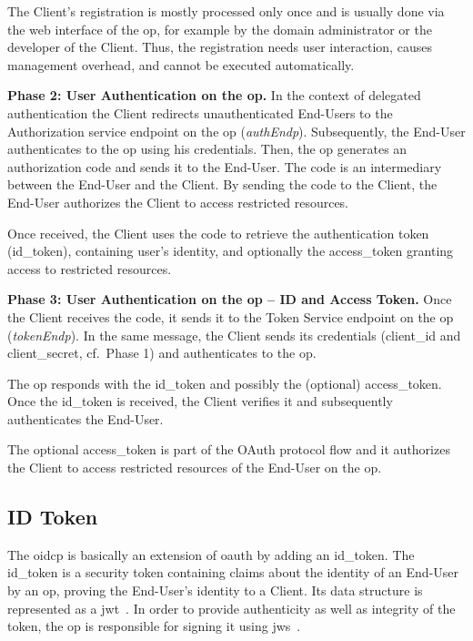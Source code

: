 \documentclass[conference,compsoc]{IEEEtran}
\renewcommand*{\paragraph}[1]{\vspace{2mm}\noindent\textbf{#1.}}
\begin{document}
The Client's registration is mostly processed only once and is usually done via the web interface of the \gls{op}, for example by the domain administrator or the developer of the Client.
Thus, the registration needs user interaction, causes management overhead, and cannot be executed automatically.


\paragraph{Phase 2: User Authentication on the \gls{op}}
In the context of delegated authentication the Client redirects unauthenticated End-Users to the Authorization service endpoint on the \gls{op} (\emph{authEndp}). 
Subsequently, the End-User authenticates to the \gls{op} using his credentials.
Then, the \gls{op} generates an authorization \gls{code} and sends it to the End-User. The \gls{code} is an intermediary between the End-User and the Client. By sending the \gls{code} to the Client, the End-User authorizes the Client to access restricted resources.

Once received, the Client uses the \gls{code} to retrieve the authentication token (\gls{id_token}), containing user's identity, and optionally the \gls{access_token} granting access to restricted resources.


\paragraph{Phase 3: User Authentication on the \gls{op} -- ID and Access Token}
Once the Client receives the \gls{code}, it sends it to the Token Service endpoint on the \gls{op} (\emph{tokenEndp}). 
In the same message, the Client sends its credentials (\gls{client_id} and \gls{client_secret}, cf.\ Phase 1) and authenticates to the \gls{op}.

The \gls{op} responds with the \gls{id_token} and possibly the (optional) \gls{access_token}.
Once the \gls{id_token} is received, the Client verifies it and subsequently authenticates the End-User.

The optional \gls{access_token} is part of the OAuth protocol flow and it authorizes the Client to  access restricted resources of the End-User on the \gls{op}.


\subsection{ID Token}
\label{sec:idToken}

The \gls{oidcp} is basically an extension of \gls{oauth} by adding an \gls{id_token}.
The \gls{id_token} is a security token containing claims about the identity of an End-User by an \gls{op}, proving the End-User's identity to a Client.
Its data structure is represented as a \gls{jwt}~\cite{Jones2014}.
In order to provide authenticity as well as integrity of the token, the \gls{op} is responsible for signing it using \gls{jws}~\cite{Jones2014a}.
\end{document}
